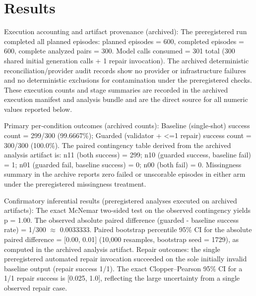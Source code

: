 \documentclass[conference]{IEEEtran}
\begin{document}
\section{Results}
Execution accounting and artifact provenance (archived): The preregistered run completed all planned episodes: planned episodes = 600, completed episodes = 600, complete analyzed pairs = 300. Model calls consumed = 301 total (300 shared initial generation calls + 1 repair invocation). The archived deterministic reconciliation/provider audit records show no provider or infrastructure failures and no deterministic exclusions for contamination under the preregistered checks. These execution counts and stage summaries are recorded in the archived execution manifest and analysis bundle and are the direct source for all numeric values reported below.

Primary per‑condition outcomes (archived counts): Baseline (single‑shot) success count = 299/300 (99.6667\%); Guarded (validator + <=1 repair) success count = 300/300 (100.0\%). The paired contingency table derived from the archived analysis artifact is: n11 (both success) = 299; n10 (guarded success, baseline fail) = 1; n01 (guarded fail, baseline success) = 0; n00 (both fail) = 0. Missingness summary in the archive reports zero failed or unscorable episodes in either arm under the preregistered missingness treatment.

Confirmatory inferential results (preregistered analyses executed on archived artifacts): The exact McNemar two‑sided test on the observed contingency yields p = 1.00. The observed absolute paired difference (guarded - baseline success rate) = 1/300 \ensuremath{\approx} 0.0033333. Paired bootstrap percentile 95\% CI for the absolute paired difference = [0.00, 0.01] (10,000 resamples, bootstrap seed = 1729), as computed in the archived analysis artifact. Repair outcomes: the single preregistered automated repair invocation succeeded on the sole initially invalid baseline output (repair success 1/1). The exact Clopper--Pearson 95\% CI for a 1/1 repair success is [0.025, 1.0], reflecting the large uncertainty from a single observed repair case.
\end{document}
